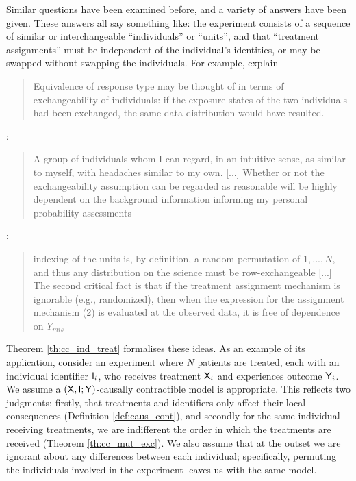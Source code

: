 Similar questions have been examined before, and a variety of answers have been given. These answers all say something like: the experiment consists of a sequence of similar or interchangeable ``individuals'' or ``units'', and that ``treatment assignments'' must be independent of the individual's identities, or may be swapped without swapping the individuals. For example, \citet{greenland_identifiability_1986} explain

\begin{quote}
    Equivalence of response type may be thought of in terms of exchangeability of individuals: if the exposure states of the two individuals had been exchanged, the same data distribution would have resulted.
\end{quote}

\citet{dawid_decision-theoretic_2020}:

\begin{quote}
    A group of individuals whom I can regard, in an intuitive sense, as similar to myself, with headaches similar to my own. [...] Whether or not the exchangeability assumption can be regarded as reasonable will be highly dependent on the background information informing my personal probability assessments
\end{quote}

\citet{rubin_causal_2005}:

\begin{quote}
    indexing of the units is, by definition, a random permutation of $1,..., N$, and thus any distribution on the science must be row-exchangeable [...] The second critical fact is that if the treatment assignment mechanism is ignorable (e.g., randomized), then when the expression for the assignment mechanism (2) is evaluated at the observed data, it is free of dependence on $Y_{mis}$
\end{quote}

Theorem \ref{th:cc_ind_treat} formalises these ideas. As an example of its application, consider an experiment where $N$ patients are treated, each with an individual identifier $\mathsf{I}_i$, who receives treatment $\mathsf{X}_i$ and experiences outcome $\mathsf{Y}_i$. We assume a $(\mathsf{X},\mathsf{I};\mathsf{Y})$-causally contractible model is appropriate. This reflects two judgments; firstly, that treatments and identifiers only affect their local consequences (Definition \ref{def:caus_cont}), and secondly for the same individual receiving treatments, we are indifferent the order in which the treatments are received (Theorem \ref{th:cc_mut_exc}). We also assume that at the outset we are ignorant about any differences between each individual; specifically, permuting the individuals involved in the experiment leaves us with the same model.

